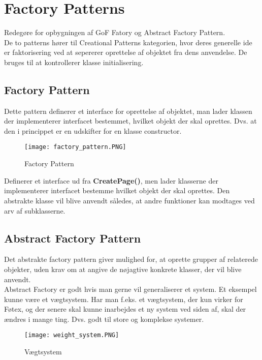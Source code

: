 \documentclass[../SWD_disp.tex]{subfiles}
\begin{document}
\section{Factory Patterns}
Redegøre for opbygningen af GoF Fatory og Abstract Factory Pattern.
\\

De to patterns hører til Creational Patterns kategorien, hvor deres generelle ide er faktorisering ved at sepererer oprettelse af objektet fra dens anvendelse. De bruges til at kontrollerer klasse initialisering.

\subsection*{Factory Pattern}
Dette pattern definerer et interface for oprettelse af objektet, man lader klassen der implementerer interfacet bestemmet, hvilket objekt der skal oprettes. Dvs. at den i princippet er en udskifter for en klasse constructor.

\begin{figure}[H]
    \centering
    \texttt{[image: factory\_pattern.PNG]}
    \caption{Factory Pattern}
    \label{fig:factory_pattern}
\end{figure}

Definerer et interface ud fra \textbf{CreatePage()}, men lader klasserne der implementerer interfacet bestemme hvilket objekt der skal oprettes. Den abstrakte klasse vil blive anvendt således, at andre funktioner kan modtages ved arv af subklasserne.

\subsection*{Abstract Factory Pattern}
Det abstrakte factory pattern giver mulighed for, at oprette grupper af relaterede objekter, uden krav om at angive de nøjagtive konkrete klasser, der vil blive anvendt.
\\

Abstract Factory er godt hvis man gerne vil generaliserer et system. Et eksempel kunne være et vægtsystem. Har man f.eks. et vægtsystem, der kun virker for Føtex, og der senere skal kunne inarbejdes et ny system ved siden af, skal der ændres i mange ting. Dvs. godt til store og komplekse systemer.


\begin{figure}[H]
    \centering
    \texttt{[image: weight\_system.PNG]}
    \caption{Vægtsystem}
    \label{fig:weight_system}
\end{figure}
\end{document}
